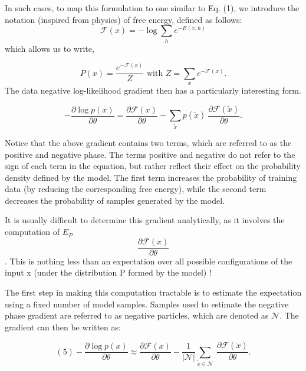 \documentclass[12pt]{article}
\begin{document}
In such cases, to map this formulation to one similar to Eq. (1), we introduce the notation (inspired from physics) of free energy, defined as follows:
\begin{equation}
\mathcal{F}(x) = - \log \sum_h e^{-E(x,h)}
\end{equation}
which allows us to write,

\begin{equation}
P(x) = \frac{e^{-\mathcal{F}(x)}}{Z} \text{ with } Z=\sum_x e^{-\mathcal{F}(x)}.
\end{equation}
The data negative log-likelihood gradient then has a particularly interesting form.

\begin{equation}
- \frac{\partial  \log p(x)}{\partial \theta}
= \frac{\partial \mathcal{F}(x)}{\partial \theta} -
       \sum_{\tilde{x}} p(\tilde{x}) \
           \frac{\partial \mathcal{F}(\tilde{x})}{\partial \theta}.
\end{equation}

Notice that the above gradient contains two terms, which are referred to as the positive and negative phase. The terms positive and negative do not refer to the sign of each term in the equation, but rather reflect their effect on the probability density defined by the model. The first term increases the probability of training data (by reducing the corresponding free energy), while the second term decreases the probability of samples generated by the model.

It is usually difficult to determine this gradient analytically, as it involves the computation of $E_P$ \[ \frac{\partial \mathcal{F}(x)} {\partial \theta} \] . This is nothing less than an expectation over all possible configurations of the input x (under the distribution P formed by the model) !

The first step in making this computation tractable is to estimate the expectation using a fixed number of model samples. Samples used to estimate the negative phase gradient are referred to as negative particles, which are denoted as $\mathcal{N}$. The gradient can then be written as:

\begin{equation}
(5)- \frac{\partial \log p(x)}{\partial \theta}
 \approx
  \frac{\partial \mathcal{F}(x)}{\partial \theta} -
   \frac{1}{|\mathcal{N}|}\sum_{\tilde{x} \in \mathcal{N}} \
   \frac{\partial \mathcal{F}(\tilde{x})}{\partial \theta}.
\end{equation}
\end{document}
